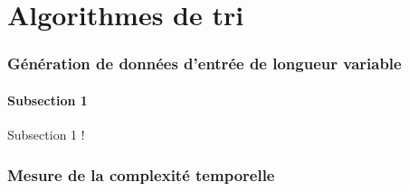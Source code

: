 \part{Algorithmes de tri}

  \section{Génération de données d'entrée de longueur variable}

    \subsection{Subsection 1}

    Subsection 1 !

  \section{Mesure de la complexité temporelle}

